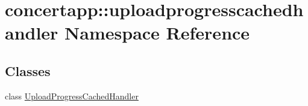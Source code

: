 \hypertarget{namespaceconcertapp_1_1uploadprogresscachedhandler}{
\section{concertapp::uploadprogresscachedhandler Namespace Reference}
\label{namespaceconcertapp_1_1uploadprogresscachedhandler}
}
\subsection*{Classes}
\begin{DoxyCompactItemize}
\item 
class \hyperlink{classconcertapp_1_1uploadprogresscachedhandler_1_1_upload_progress_cached_handler}{UploadProgressCachedHandler}
\end{DoxyCompactItemize}
